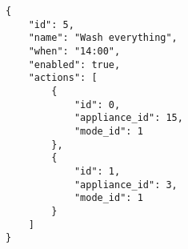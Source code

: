\begin{lstlisting}[language=numbered,caption={Example of a routine with two actions},label=code:routine_wash_everything,float,floatplacement=H]
{
    "id": 5,
    "name": "Wash everything",
    "when": "14:00",
    "enabled": true,
    "actions": [
        {
            "id": 0,
            "appliance_id": 15,
            "mode_id": 1
        },
        {
            "id": 1,
            "appliance_id": 3,
            "mode_id": 1
        }
    ]
}
\end{lstlisting}
